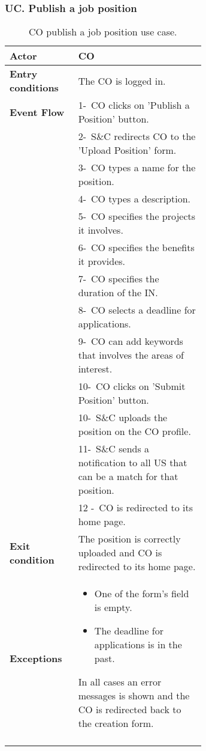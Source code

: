 \subsubsection*{UC\cuc . Publish a job position}
\begin{center}
    \begin{longtable}{|l|p{0.65\linewidth}|}
        \hline
        \textbf{Actor}            & CO \\
        \hline
        \textbf{Entry conditions} & The CO is logged in. \\
        \hline
        \textbf{Event Flow}       & 1-\ CO clicks on 'Publish a Position' button. \\
        & 2-\ S\&C redirects CO to the 'Upload Position' form. \\
        & 3-\ CO types a name for the position.\\
        & 4-\ CO types a description.\\
        & 5-\ CO specifies the projects it involves. \\
        & 6-\ CO specifies the benefits it provides. \\
        & 7-\ CO specifies the duration of the IN. \\
        & 8-\ CO selects a deadline for applications. \\
        & 9-\ CO can add keywords that involves the areas of interest. \\
        & 10-\ CO clicks on 'Submit Position' button.\\
        & 10-\ S\&C uploads the position on the CO profile. \\
        & 11-\ S\&C sends a notification to all US that can be a match for that position. \\
        & 12 -\ CO is redirected to its home page.\\
        \hline
        \textbf{Exit condition}   & The position is correctly uploaded and CO is redirected to its home page. \\
        \hline
        \textbf{Exceptions}       & \begin{itemize}
            \item  One of the form's field is empty.
            \item  The deadline for applications is in the past.
        \end{itemize}In all cases an error messages is shown and the CO is redirected back to the creation form. \\
        \hline
        \caption{CO publish a job position use case.}
        \label{tab: cp_use_case}
    \end{longtable}
\end{center}


